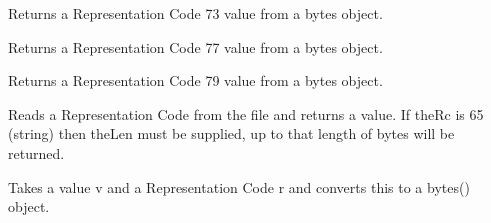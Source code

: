 \documentclass[letterpaper,10pt,english]{sphinxmanual}
\begin{document}

\begin{fulllineitems}
\label{\detokenize{ref/LIS/core/RepCode:TotalDepth.LIS.core.RepCode.readBytes73}}
Returns a Representation Code 73 value from a bytes object.

\end{fulllineitems}


\begin{fulllineitems}
\label{\detokenize{ref/LIS/core/RepCode:TotalDepth.LIS.core.RepCode.readBytes77}}
Returns a Representation Code 77 value from a bytes object.

\end{fulllineitems}


\begin{fulllineitems}
\label{\detokenize{ref/LIS/core/RepCode:TotalDepth.LIS.core.RepCode.readBytes79}}
Returns a Representation Code 79 value from a bytes object.

\end{fulllineitems}


\begin{fulllineitems}
\label{\detokenize{ref/LIS/core/RepCode:TotalDepth.LIS.core.RepCode.readRepCode}}
Reads a Representation Code from the file and returns a value.
If theRc is 65 (string) then theLen must be supplied, up to that length of
bytes will be returned.

\end{fulllineitems}


\begin{fulllineitems}
\label{\detokenize{ref/LIS/core/RepCode:TotalDepth.LIS.core.RepCode.writeBytes}}
Takes a value v and a Representation Code r and converts this to a
bytes() object.

\end{fulllineitems}
\end{document}

